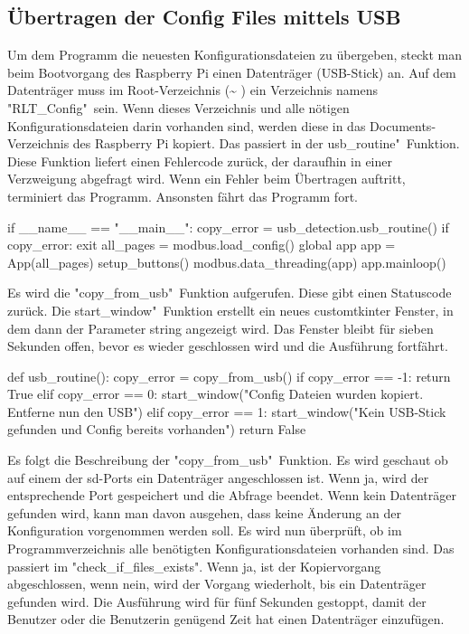 \subsection{Übertragen der Config Files mittels USB}
Um dem Programm die neuesten Konfigurationsdateien zu übergeben, steckt man beim Bootvorgang des Raspberry Pi einen Datenträger (USB-Stick) an. Auf dem Datenträger muss im Root-Verzeichnis (\textasciitilde
) ein Verzeichnis namens "RLT\_Config"\ sein. Wenn dieses Verzeichnis und alle nötigen Konfigurationsdateien darin vorhanden sind, werden diese in das Documents-Verzeichnis des Raspberry Pi kopiert. Das passiert in der \dq usb\_routine"\ Funktion. Diese Funktion liefert einen Fehlercode zurück, der daraufhin in einer Verzweigung abgefragt wird. Wenn ein Fehler beim Übertragen auftritt, terminiert das Programm. Ansonsten fährt das Programm fort.


\begin{pythoncode}
if __name__ == "__main__":
	copy_error = usb_detection.usb_routine()
	if copy_error:
		exit
	all_pages = modbus.load_config()
	global app
	app = App(all_pages)
	setup_buttons()
	modbus.data_threading(app)
	app.mainloop()	
\end{pythoncode}

Es wird die "copy\_from\_usb"\ Funktion aufgerufen. Diese gibt einen Statuscode zurück. Die \dq start\_window"\ Funktion erstellt ein neues customtkinter Fenster, in dem dann der Parameter string angezeigt wird. Das Fenster bleibt für sieben Sekunden offen, bevor es wieder geschlossen wird und die Ausführung fortfährt.

\begin{pythoncode}
def usb_routine():
	copy_error = copy_from_usb()
	if copy_error == -1:
		return True
	elif copy_error == 0:
		start_window("Config Dateien wurden kopiert. Entferne nun den USB")   
	elif copy_error == 1: 
		start_window("Kein USB-Stick gefunden und Config bereits vorhanden")  
	return False
\end{pythoncode}

Es folgt die Beschreibung der "copy\_from\_usb"\ Funktion. Es wird geschaut ob auf einem der sd-Ports ein Datenträger angeschlossen ist. Wenn ja, wird der entsprechende Port gespeichert und die Abfrage beendet. Wenn kein Datenträger gefunden wird, kann man davon ausgehen, dass keine Änderung an der Konfiguration vorgenommen werden soll. Es wird nun überprüft, ob im Programmverzeichnis alle benötigten Konfigurationsdateien vorhanden sind. Das passiert im "check\_if\_files\_exists". Wenn ja, ist der Kopiervorgang abgeschlossen, wenn nein, wird der Vorgang wiederholt, bis ein Datenträger gefunden wird. Die Ausführung wird für fünf Sekunden gestoppt, damit der Benutzer oder die Benutzerin genügend Zeit hat einen Datenträger einzufügen.

